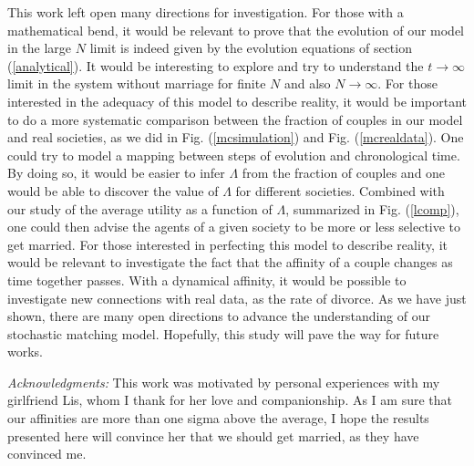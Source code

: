 \documentclass[12pt]{article}
\begin{document}
This work left open many directions for investigation. For those with a mathematical bend, it would be relevant to prove that the evolution of our model in the large $N$ limit is indeed given by the evolution equations of section (\ref{analytical}). It would be interesting to explore and try to understand the $t\rightarrow\infty$ limit in the system without marriage for finite $N$ and also $N\rightarrow\infty$. For those interested in the adequacy of this model to describe reality, it would be important to do a more systematic comparison between the fraction of couples in our model and real societies, as we did in Fig. (\ref{mcsimulation}) and Fig. (\ref{mcrealdata}). One could try to model a mapping between steps of evolution and chronological time. By doing so, it would be easier to infer $\Lambda$ from the fraction of couples and one would be able to discover the value of $\Lambda$ for different societies. Combined with our study of the average utility as a function of $\Lambda$, summarized in Fig. (\ref{lcomp}), one could then advise the agents of a given society to be more or less selective to get married. For those interested in perfecting this model to describe reality, it would be relevant to investigate the fact that the affinity of a couple changes as time together passes. With a dynamical affinity, it would be possible to investigate new connections with real data, as the rate of divorce. %
As we have just shown, there are many open directions to advance the understanding of our stochastic matching model. Hopefully, this study will pave the way for future works.




\vspace{5mm}
\noindent
\textit{Acknowledgments:} This work was motivated by personal experiences with my girlfriend Lis, whom I thank for her love and companionship. As I am sure that our affinities are more than one sigma above the average, I hope the results presented here will convince her that we should get married, as they have convinced me.

\newpage


\end{document}
